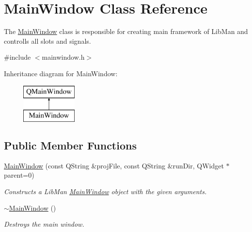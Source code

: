 \hypertarget{classMainWindow}{\section{Main\-Window Class Reference}
\label{classMainWindow}
}


The \hyperlink{classMainWindow}{Main\-Window} class is responsible for creating main framework of Lib\-Man and controlls all slots and signals.  




{\ttfamily \#include $<$mainwindow.\-h$>$}

Inheritance diagram for Main\-Window\-:\begin{figure}[H]
\begin{center}
\leavevmode
\includegraphics[height=2.000000cm]{classMainWindow}
\end{center}
\end{figure}
\subsection*{Public Member Functions}
\begin{DoxyCompactItemize}
\item 
\hyperlink{classMainWindow_a5e929afe3d79ebd9b7c48d89799308ca}{Main\-Window} (const Q\-String \&proj\-File, const Q\-String \&run\-Dir, Q\-Widget $\ast$parent=0)
\begin{DoxyCompactList}\small\item\em Constructs a Lib\-Man \hyperlink{classMainWindow}{Main\-Window} object with the given arguments. \end{DoxyCompactList}\item 
\hyperlink{classMainWindow_ae98d00a93bc118200eeef9f9bba1dba7}{$\sim$\-Main\-Window} ()
\begin{DoxyCompactList}\small\item\em Destroys the main window. \end{DoxyCompactList}\end{DoxyCompactItemize}
